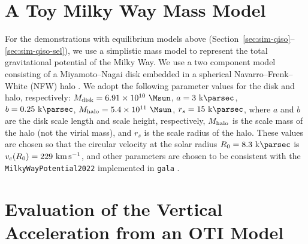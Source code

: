 \documentclass[modern]{aastex631}
\begin{document}

\appendix

\section{A Toy Milky Way Mass Model}
\label{sec:appendix-potential}

For the demonstrations with equilibrium models above
(Section~\ref{sec:sim-qiso}--\ref{sec:sim-qiso-sel}), we use a simplistic mass model to
represent the total gravitational potential of the Milky Way.
We use a two component model consisting of a Miyamoto--Nagai disk \citep{Miyamoto:1975}
embedded in a spherical Navarro--Frenk--White (NFW) halo \citep{Navarro:1997}.
We adopt the following parameter values for the disk and halo, respectively: $M_{\rm
disk} = 6.91\times 10^{10}~\unit{\Msun}$, $a = 3~\kpc$, $b = 0.25~\kpc$, $M_{\rm halo} =
5.4\times 10^{11}~\unit{\Msun}$, $r_s = 15~\kpc$, where $a$ and $b$ are the disk scale
length and scale height, respectively, $M_{\rm halo}$ is the scale mass of the halo (not
the virial mass), and $r_s$ is the scale radius of the halo.
These values are chosen so that the circular velocity at the solar radius $R_0 =
8.3~\kpc$ is $v_c(R_0) = 229~\kms$, and other parameters are chosen to be consistent
with the \texttt{MilkyWayPotential2022} implemented in \texttt{gala} \citep{gala}.




\section{Evaluation of the Vertical Acceleration from an OTI Model}
\label{sec:appendix-az}
\end{document}
